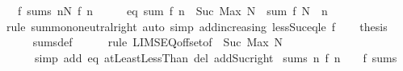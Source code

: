 \begin{isabellebody}
\ \ \ {\isachardoublequoteopen}f\ sums\ {\isacharparenleft}{\kern0pt}{\isasymSum}n{\isasymin}N{\isachardot}{\kern0pt}\ f\ n{\isacharparenright}{\kern0pt}{\isachardoublequoteclose}\isanewline
%
\isadelimproof
%
\endisadelimproof
%
\isatagproof
{}\isamarkupfalse%
\ {\isacharminus}{\kern0pt}\isanewline
\ \ \isamarkupfalse%
\ eq{\isacharcolon}{\kern0pt}\ {\isachardoublequoteopen}sum\ f\ {\isacharbraceleft}{\kern0pt}{\isachardot}{\kern0pt}{\isachardot}{\kern0pt}{\isacharless}{\kern0pt}n\ {\isacharplus}{\kern0pt}\ Suc\ {\isacharparenleft}{\kern0pt}Max\ N{\isacharparenright}{\kern0pt}{\isacharbraceright}{\kern0pt}\ {\isacharequal}{\kern0pt}\ sum\ f\ N{\isachardoublequoteclose}\ \ n\isanewline
\ \ \ \ \isamarkupfalse%
\ {\isacharparenleft}{\kern0pt}rule\ sum{\isachardot}{\kern0pt}mono{\isacharunderscore}{\kern0pt}neutral{\isacharunderscore}{\kern0pt}right{\isacharparenright}{\kern0pt}\ {\isacharparenleft}{\kern0pt}auto\ simp{\isacharcolon}{\kern0pt}\ add{\isacharunderscore}{\kern0pt}increasing\ less{\isacharunderscore}{\kern0pt}Suc{\isacharunderscore}{\kern0pt}eq{\isacharunderscore}{\kern0pt}le\ f{\isacharparenright}{\kern0pt}\isanewline
\ \ \isamarkupfalse%
\ {\isacharquery}{\kern0pt}thesis\isanewline
\ \ \ \ \isamarkupfalse%
\ sums{\isacharunderscore}{\kern0pt}def\isanewline
\ \ \ \ \isamarkupfalse%
\ {\isacharparenleft}{\kern0pt}rule\ LIMSEQ{\isacharunderscore}{\kern0pt}offset{\isacharbrackleft}{\kern0pt}of\ {\isacharunderscore}{\kern0pt}\ {\isachardoublequoteopen}Suc\ {\isacharparenleft}{\kern0pt}Max\ N{\isacharparenright}{\kern0pt}{\isachardoublequoteclose}{\isacharbrackright}{\kern0pt}{\isacharparenright}{\kern0pt}\isanewline
\ \ \ \ \ \ {\isacharparenleft}{\kern0pt}simp\ add{\isacharcolon}{\kern0pt}\ eq\ atLeast{}LessThan\ del{\isacharcolon}{\kern0pt}\ add{\isacharunderscore}{\kern0pt}Suc{\isacharunderscore}{\kern0pt}right{\isacharparenright}{\kern0pt}\isanewline
{}\isamarkupfalse%
%
\endisatagproof
{\isafoldproof}%
%
\isadelimproof
\isanewline
%
\endisadelimproof
\isanewline
{}\isamarkupfalse%
\ sums{\isacharunderscore}{\kern0pt}{}{\isacharcolon}{\kern0pt}\ {\isachardoublequoteopen}{\isacharparenleft}{\kern0pt}{\isasymAnd}n{\isachardot}{\kern0pt}\ f\ n\ {\isacharequal}{\kern0pt}\ {}{\isacharparenright}{\kern0pt}\ {\isasymLongrightarrow}\ {\isacharparenleft}{\kern0pt}f\ sums\ {}{\isacharparenright}{\kern0pt}{\isachardoublequoteclose}\isanewline

\end{isabellebody}
